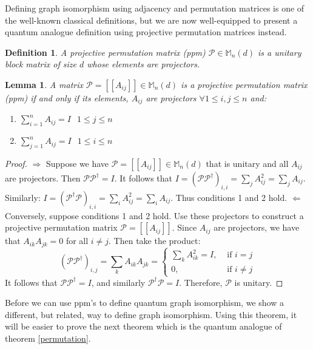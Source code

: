\documentclass[12pt]{article}
\newtheorem{lem}[thm]{Lemma}
\newtheorem{defn}[thm]{Definition}
\begin{document}
Defining graph isomorphism using adjacency and permutation matrices is one of the well-known classical definitions, but we are now well-equipped to present a quantum analogue definition using projective permutation matrices instead.

\begin{defn}
A projective permutation matrix (ppm) $\mathcal{P} \in \mathbb{M}_n(d)$ is a unitary block matrix of size $d$ whose elements are projectors.
\end{defn}

\begin{lem} \label{ppm}
A matrix $\mathcal{P} = [[A_{ij}]] \in \mathbb{M}_n(d)$ is a projective permutation matrix (ppm) if and only if its elements, $A_{ij}$ are projectors $\forall 1 \leq i, j \leq n$ and:
\begin{enumerate}
\item $\sum_{i=1}^n A_{ij} = I$ $ $ $1 \leq j \leq n$
\item $\sum_{j=1}^n A_{ij} = I$ $ $ $1 \leq i \leq n$
\end{enumerate}
\end{lem}
\begin{proof}
$\Rightarrow$ Suppose we have $\mathcal{P} = [[A_{ij}]] \in \mathbb{M}_n(d)$ that is unitary and all $A_{ij}$ are projectors. Then $\mathcal{P} \mathcal{P}^{\dag} = I$. It follows that $I = (\mathcal{P} \mathcal{P}^{\dag})_{i, i} = \sum_j A_{ij}^2 = \sum_j A_{ij}$. Similarly: $I = (\mathcal{P}^{\dag} \mathcal{P})_{i, i} = \sum_i A_{ij}^2 = \sum_i A_{ij}$. Thus conditions 1 and 2 hold.
$\Leftarrow$ Conversely, suppose conditions 1 and 2 hold. Use these projectors to construct a projective permutation matrix $\mathcal{P} = [[A_{ij}]]$. Since $A_{ij}$ are projectors, we have that $A_{ik}A_{jk} = 0$ for all $i \neq j$. Then take the product: 
\[ (\mathcal{P}\mathcal{P}^{\dag})_{i,j} = \sum_k A_{ik}A_{jk} = \begin{cases} 
\sum_k A_{ik}^2 = I, & \text{ if } i = j \\
0, & \text{ if } i \neq j  \end{cases}
\]
It follows that $\mathcal{P}\mathcal{P}^{\dag} = I$, and similarly $\mathcal{P}^{\dag} \mathcal{P} = I$. Therefore, $\mathcal{P}$ is unitary.
\end{proof}

Before we can use ppm's to define quantum graph isomorphism, we show a different, but related, way to define graph isomorphism. Using this theorem, it will be easier to prove the next theorem which is the quantum analogue of theorem \ref{permutation}.
\end{document}
